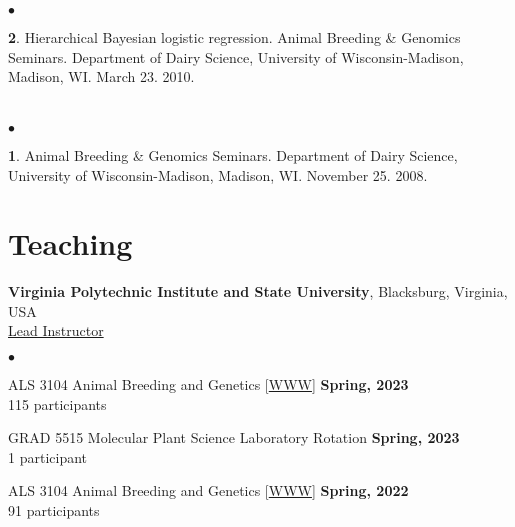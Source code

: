 \documentclass[margin,line,10pt]{res}
\newenvironment{list2}{
  \begin{list}{$\bullet$}{%
      \setlength{\itemsep}{0in}
      \setlength{\parsep}{0in} \setlength{\parskip}{0in}
      \setlength{\topsep}{0in} \setlength{\partopsep}{0in} 
      \setlength{\leftmargin}{0.2in}}}{\end{list}}
\begin{document}
\begin{resume}
\begin{list2}
\vspace{0.5cm}
\item [{\bf 2}.] Hierarchical Bayesian logistic regression. Animal Breeding \& Genomics Seminars.  Department of Dairy Science, University of Wisconsin-Madison, Madison, WI. March 23. 2010.
\end{list2}

\section{}
\begin{list2}
\item  [{\bf 1}.] Animal Breeding \& Genomics Seminars.  Department of Dairy Science, University of Wisconsin-Madison, Madison, WI. November 25. 2008. 
\end{list2}




\vspace{0.5cm}
\section{\sc Teaching}
{\bf Virginia Polytechnic Institute and State University}, Blacksburg, Virginia, USA  \vspace{0.2cm} \\
\underline{Lead Instructor}
\vspace{0.4cm}
\begin{list2}


  \item ALS 3104 Animal Breeding and Genetics [\textcolor{blue}{\href{http://morotalab.org/als3104-2022/ALS3104.html}{WWW}}] 
  \hfill {\bf Spring, 2023} \\
         115  participants 
  
         \vspace{0.5cm}

  \item GRAD 5515 Molecular Plant Science Laboratory Rotation
  \hfill {\bf Spring, 2023} \\
  1 participant

  \vspace{0.5cm}

   \item ALS 3104 Animal Breeding and Genetics [\textcolor{blue}{\href{http://morotalab.org/als3104-2022/ALS3104.html}{WWW}}] 
  \hfill {\bf Spring, 2022} \\
         91  participants 
  
         \vspace{0.5cm}
         


\end{list2}
\end{resume}
\end{document}
